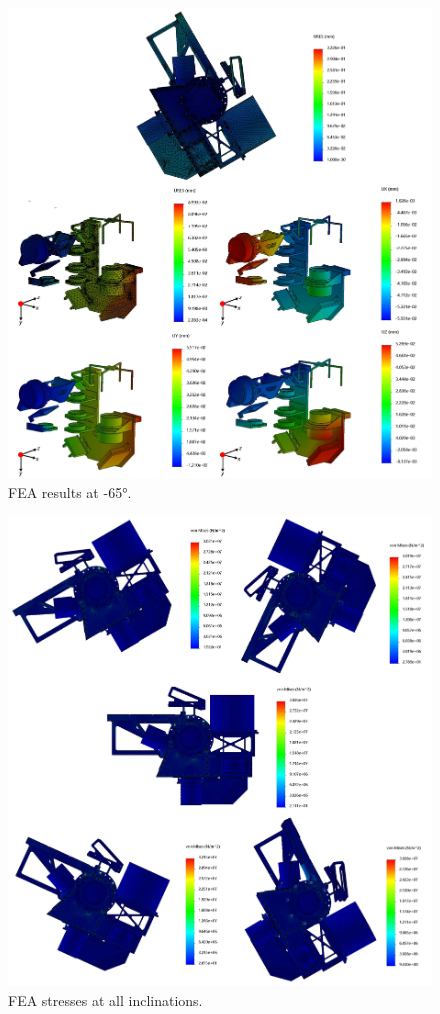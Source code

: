 \documentclass{report}
\begin{document}
\clearpage

\begin{figure}
\centering
\includegraphics[width=1.1\linewidth]{figures/AllFEA-65deg.png}
\caption{FEA results at -65°.}
\label{figure:FEAD1e}
\end{figure}

\clearpage

\begin{figure}
\centering
\includegraphics[width=1.1\linewidth]{figures/AllFEAStresses.png}
\caption{FEA stresses at all inclinations.}
\label{figure:FEAD1f}
\end{figure}
\end{document}
